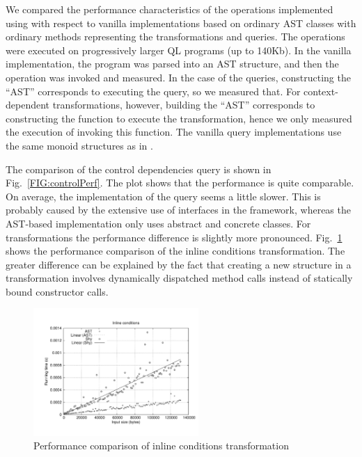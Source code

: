 We compared the performance characteristics of the operations implemented using \name with respect to vanilla implementations based on ordinary AST classes with ordinary methods representing the transformations and queries.
The operations were executed on progressively larger QL programs (up to 140Kb).
In the vanilla implementation, the program was parsed into an AST structure, and then the operation was invoked and measured.
In the case of the \name queries, constructing the ``AST'' corresponds to executing the query, so we measured that.
For context-dependent transformations, however, building the ``AST'' corresponds to constructing the function to execute the transformation, hence we only measured the execution of invoking this function.
The vanilla query implementations use the same monoid structures as in \name.

The comparison of the control dependencies query is shown in Fig.~\ref{FIG:controlPerf}.
The plot shows that the performance is quite comparable.
On average, the \name implementation of the query seems a little slower.
This is probably caused by the extensive use of interfaces in the \name framework, whereas the AST-based implementation only uses abstract and concrete classes.
For transformations the performance difference is slightly more pronounced.
Fig.~\ref{FIG:inlinePerf} shows the performance comparison of the inline conditions transformation.
The greater difference can be explained by the fact that creating a new structure in a \name transformation involves dynamically dispatched method calls instead of statically bound constructor calls.

\begin{figure}[t]
  \nocaptionrule
  \hspace*{-.05\textwidth}
  \includegraphics[width=0.56\textwidth]{plots/inline}
  \caption{Performance comparison of inline conditions transformation\label{FIG:inlinePerf}}
\end{figure}





